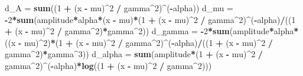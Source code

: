 \documentclass[
]{article}
\newenvironment{Shaded}{\begin{snugshade}}{\end{snugshade}}
\newcommand{\DecValTok}[1]{\textcolor[rgb]{0.00,0.00,0.81}{#1}}
\newcommand{\FunctionTok}[1]{\textcolor[rgb]{0.13,0.29,0.53}{\textbf{#1}}}
\newcommand{\NormalTok}[1]{#1}
\newcommand{\OtherTok}[1]{\textcolor[rgb]{0.56,0.35,0.01}{#1}}
\newcommand{\SpecialCharTok}[1]{\textcolor[rgb]{0.81,0.36,0.00}{\textbf{#1}}}
\begin{document}
\begin{Shaded}
\begin{Highlighting}[]
\NormalTok{  d\_A }\OtherTok{=} \FunctionTok{sum}\NormalTok{((}\DecValTok{1} \SpecialCharTok{+}\NormalTok{ (x }\SpecialCharTok{{-}}\NormalTok{ mu)}\SpecialCharTok{\^{}}\DecValTok{2} \SpecialCharTok{/}\NormalTok{ gamma}\SpecialCharTok{\^{}}\DecValTok{2}\NormalTok{)}\SpecialCharTok{\^{}}\NormalTok{(}\SpecialCharTok{{-}}\NormalTok{alpha))}
\NormalTok{  d\_mu }\OtherTok{=} \SpecialCharTok{{-}}\DecValTok{2}\SpecialCharTok{*}\FunctionTok{sum}\NormalTok{(amplitude}\SpecialCharTok{*}\NormalTok{alpha}\SpecialCharTok{*}\NormalTok{(x }\SpecialCharTok{{-}}\NormalTok{ mu)}\SpecialCharTok{*}\NormalTok{(}\DecValTok{1} \SpecialCharTok{+}\NormalTok{ (x }\SpecialCharTok{{-}}\NormalTok{ mu)}\SpecialCharTok{\^{}}\DecValTok{2} \SpecialCharTok{/}\NormalTok{ gamma}\SpecialCharTok{\^{}}\DecValTok{2}\NormalTok{)}\SpecialCharTok{\^{}}\NormalTok{(}\SpecialCharTok{{-}}\NormalTok{alpha)}\SpecialCharTok{/}\NormalTok{((}\DecValTok{1} \SpecialCharTok{+}\NormalTok{ (x }\SpecialCharTok{{-}}\NormalTok{ mu)}\SpecialCharTok{\^{}}\DecValTok{2} \SpecialCharTok{/}\NormalTok{ gamma}\SpecialCharTok{\^{}}\DecValTok{2}\NormalTok{)}\SpecialCharTok{*}\NormalTok{gamma}\SpecialCharTok{\^{}}\DecValTok{2}\NormalTok{))}
\NormalTok{  d\_gamma }\OtherTok{=} \SpecialCharTok{{-}}\DecValTok{2}\SpecialCharTok{*}\FunctionTok{sum}\NormalTok{(amplitude}\SpecialCharTok{*}\NormalTok{alpha}\SpecialCharTok{*}\NormalTok{((x }\SpecialCharTok{{-}}\NormalTok{ mu)}\SpecialCharTok{\^{}}\DecValTok{2}\NormalTok{)}\SpecialCharTok{*}\NormalTok{(}\DecValTok{1} \SpecialCharTok{+}\NormalTok{ (x }\SpecialCharTok{{-}}\NormalTok{ mu)}\SpecialCharTok{\^{}}\DecValTok{2} \SpecialCharTok{/}\NormalTok{ gamma}\SpecialCharTok{\^{}}\DecValTok{2}\NormalTok{)}\SpecialCharTok{\^{}}\NormalTok{(}\SpecialCharTok{{-}}\NormalTok{alpha)}\SpecialCharTok{/}\NormalTok{((}\DecValTok{1} \SpecialCharTok{+}\NormalTok{ (x }\SpecialCharTok{{-}}\NormalTok{ mu)}\SpecialCharTok{\^{}}\DecValTok{2} \SpecialCharTok{/}\NormalTok{ gamma}\SpecialCharTok{\^{}}\DecValTok{2}\NormalTok{)}\SpecialCharTok{*}\NormalTok{gamma}\SpecialCharTok{\^{}}\DecValTok{3}\NormalTok{))}
\NormalTok{  d\_alpha }\OtherTok{=} \FunctionTok{sum}\NormalTok{(amplitude}\SpecialCharTok{*}\NormalTok{(}\DecValTok{1} \SpecialCharTok{+}\NormalTok{ (x }\SpecialCharTok{{-}}\NormalTok{ mu)}\SpecialCharTok{\^{}}\DecValTok{2} \SpecialCharTok{/}\NormalTok{ gamma}\SpecialCharTok{\^{}}\DecValTok{2}\NormalTok{)}\SpecialCharTok{\^{}}\NormalTok{(}\SpecialCharTok{{-}}\NormalTok{alpha)}\SpecialCharTok{*}\FunctionTok{log}\NormalTok{((}\DecValTok{1} \SpecialCharTok{+}\NormalTok{ (x }\SpecialCharTok{{-}}\NormalTok{ mu)}\SpecialCharTok{\^{}}\DecValTok{2} \SpecialCharTok{/}\NormalTok{ gamma}\SpecialCharTok{\^{}}\DecValTok{2}\NormalTok{)))}
  

\end{Highlighting}
\end{Shaded}
\end{document}
